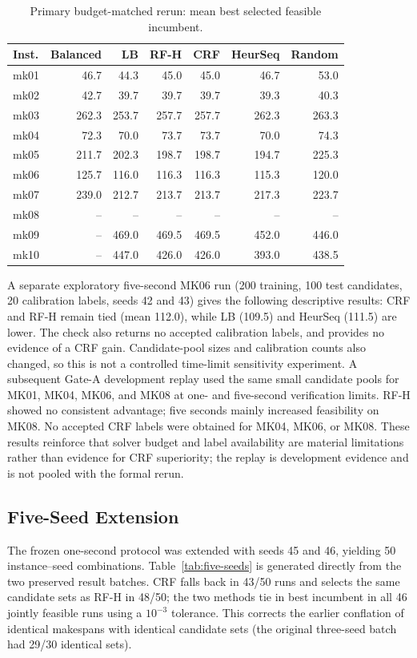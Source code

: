 \documentclass[12pt]{article}
\begin{document}
\begin{table}[htbp]\centering\caption{Primary budget-matched rerun: mean best selected feasible incumbent.}\label{tab:rerun}
\begin{tabular}{lrrrrrr}\toprule
Inst. & Balanced & LB & RF-H & CRF & HeurSeq & Random \\ \midrule
mk01 & 46.7 & 44.3 & 45.0 & 45.0 & 46.7 & 53.0 \\
mk02 & 42.7 & 39.7 & 39.7 & 39.7 & 39.3 & 40.3 \\
mk03 & 262.3 & 253.7 & 257.7 & 257.7 & 262.3 & 263.3 \\
mk04 & 72.3 & 70.0 & 73.7 & 73.7 & 70.0 & 74.3 \\
mk05 & 211.7 & 202.3 & 198.7 & 198.7 & 194.7 & 225.3 \\
mk06 & 125.7 & 116.0 & 116.3 & 116.3 & 115.3 & 120.0 \\
mk07 & 239.0 & 212.7 & 213.7 & 213.7 & 217.3 & 223.7 \\
mk08 & -- & -- & -- & -- & -- & -- \\
mk09 & -- & 469.0 & 469.5 & 469.5 & 452.0 & 446.0 \\
mk10 & -- & 447.0 & 426.0 & 426.0 & 393.0 & 438.5 \\ \bottomrule
\end{tabular}
\end{table}

A separate exploratory five-second MK06 run (200 training, 100 test candidates, 20 calibration labels, seeds 42 and 43) gives the following descriptive results: CRF and RF-H remain tied (mean 112.0), while LB (109.5) and HeurSeq (111.5) are lower. The check also returns no accepted calibration labels, and provides no evidence of a CRF gain. Candidate-pool sizes and calibration counts also changed, so this is not a controlled time-limit sensitivity experiment. A subsequent Gate-A development replay used the same small candidate pools for MK01, MK04, MK06, and MK08 at one- and five-second verification limits. RF-H showed no consistent advantage; five seconds mainly increased feasibility on MK08. No accepted CRF labels were obtained for MK04, MK06, or MK08. These results reinforce that solver budget and label availability are material limitations rather than evidence for CRF superiority; the replay is development evidence and is not pooled with the formal rerun.

\subsection{Five-Seed Extension}
The frozen one-second protocol was extended with seeds 45 and 46, yielding 50 instance--seed combinations. Table~\ref{tab:five-seeds} is generated directly from the two preserved result batches. CRF falls back in 43/50 runs and selects the same candidate sets as RF-H in 48/50; the two methods tie in best incumbent in all 46 jointly feasible runs using a $10^{-3}$ tolerance. This corrects the earlier conflation of identical makespans with identical candidate sets (the original three-seed batch had 29/30 identical sets).
\end{document}
